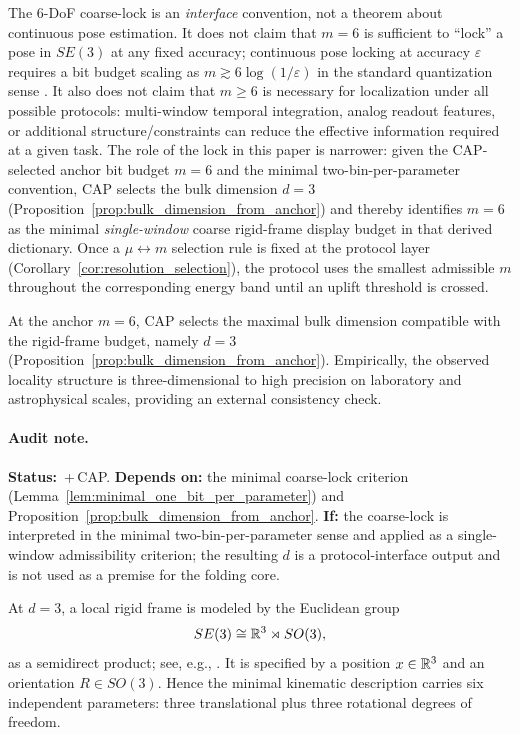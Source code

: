 \begin{remark}\label{rem:6dof_lock_scope}
The 6-DoF coarse-lock is an \emph{interface} convention, not a theorem about continuous pose estimation.
It does not claim that $m=6$ is sufficient to ``lock'' a pose in $SE(3)$ at any fixed accuracy; continuous pose locking at accuracy $\varepsilon$ requires a bit budget scaling as $m\gtrsim 6\log(1/\varepsilon)$ in the standard quantization sense \cite{GrayNeuhoff1998Quantization,CoverThomas2006}.
It also does not claim that $m\ge 6$ is necessary for localization under all possible protocols: multi-window temporal integration, analog readout features, or additional structure/constraints can reduce the effective information required at a given task.
The role of the lock in this paper is narrower: given the CAP-selected anchor bit budget $m=6$ and the minimal two-bin-per-parameter convention, CAP selects the bulk dimension $d=3$ (Proposition~\ref{prop:bulk_dimension_from_anchor}) and thereby identifies $m=6$ as the minimal \emph{single-window} coarse rigid-frame display budget in that derived dictionary.
Once a $\mu\leftrightarrow m$ selection rule is fixed at the protocol layer (Corollary~\ref{cor:resolution_selection}), the protocol uses the smallest admissible $m$ throughout the corresponding energy band until an uplift threshold is crossed.
\end{remark}

At the anchor $m=6$, CAP selects the maximal bulk dimension compatible with the rigid-frame budget, namely $d=3$ (Proposition~\ref{prop:bulk_dimension_from_anchor}).
Empirically, the observed locality structure is three-dimensional to high precision on laboratory and astrophysical scales, providing an external consistency check.

\paragraph{Audit note.}
\AuditTag \textbf{Status:} \InterfaceTag\,+\,CAP.
\textbf{Depends on:} the minimal coarse-lock criterion (Lemma~\ref{lem:minimal_one_bit_per_parameter}) and Proposition~\ref{prop:bulk_dimension_from_anchor}.
\textbf{If:} the coarse-lock is interpreted in the minimal two-bin-per-parameter sense and applied as a single-window admissibility criterion; the resulting $d$ is a protocol-interface output and is not used as a premise for the folding core.

At $d=3$, a local rigid frame is modeled by the Euclidean group
\[
SE(3)\cong \mathbb{R}^3\rtimes SO(3),
\]
as a semidirect product; see, e.g., \cite{HallLieGroups2015}.
It is specified by a position $x\in\mathbb{R}^3$ and an orientation $R\in SO(3)$.
Hence the minimal kinematic description carries six independent parameters: three translational plus three rotational degrees of freedom.


